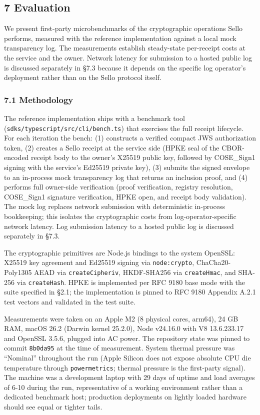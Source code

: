 \documentclass[
  11pt,
]{article}
\begin{document}
\hypertarget{evaluation}{%
\subsection{7 Evaluation}\label{evaluation}}

We present first-party microbenchmarks of the cryptographic operations
Sello performs, measured with the reference implementation against a
local mock transparency log. The measurements establish steady-state
per-receipt costs at the service and the owner. Network latency for
submission to a hosted public log is discussed separately in §7.3
because it depends on the specific log operator's deployment rather than
on the Sello protocol itself.

\hypertarget{methodology}{%
\subsubsection{7.1 Methodology}\label{methodology}}

The reference implementation \citep{sello-repo} ships with a benchmark
tool (\texttt{sdks/typescript/src/cli/bench.ts}) that exercises the full receipt
lifecycle. For each iteration the bench: (1) constructs a verified
compact JWS authorization token, (2) creates a Sello receipt at the
service side (HPKE seal of the CBOR-encoded receipt body to the owner's
X25519 public key, followed by COSE\_Sign1 signing with the service's
Ed25519 private key), (3) submits the signed envelope to an in-process
mock transparency log that returns an inclusion proof, and (4) performs
full owner-side verification (proof verification, registry resolution,
COSE\_Sign1 signature verification, HPKE open, and receipt body
validation). The mock log replaces network submission with deterministic
in-process bookkeeping; this isolates the cryptographic costs from
log-operator-specific network latency. Log submission latency to a
hosted public log is discussed separately in §7.3.

The cryptographic primitives are Node.js bindings to the system OpenSSL:
X25519 key agreement and Ed25519 signing via \texttt{node:crypto},
ChaCha20-Poly1305 AEAD via \texttt{createCipheriv}, HKDF-SHA256 via
\texttt{createHmac}, and SHA-256 via \texttt{createHash}. HPKE is
implemented per RFC 9180 base mode with the suite specified in §2.1; the
implementation is pinned to RFC 9180 Appendix A.2.1 test vectors and
validated in the test suite.

Measurements were taken on an Apple M2 (8 physical cores, arm64), 24 GB
RAM, macOS 26.2 (Darwin kernel 25.2.0), Node v24.16.0 with V8
13.6.233.17 and OpenSSL 3.5.6, plugged into AC power. The repository
state was pinned to commit \texttt{8b0da95} at the time of measurement.
System thermal pressure was ``Nominal'' throughout the run (Apple
Silicon does not expose absolute CPU die temperature through
\texttt{powermetrics}; thermal pressure is the first-party signal). The
machine was a development laptop with 29 days of uptime and load
averages of 6-10 during the run, representative of a working environment
rather than a dedicated benchmark host; production deployments on
lightly loaded hardware should see equal or tighter tails.
\end{document}

